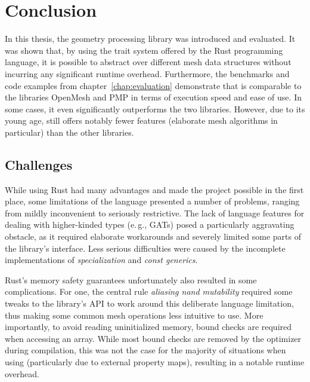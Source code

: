 \chapter{Conclusion}
\label{chap:conclusion}

In this thesis, the geometry processing library  was introduced and evaluated.
It was shown that, by using the trait system offered by the Rust programming language,  it is possible to abstract over different mesh data structures without incurring any significant runtime overhead.
Furthermore, the benchmarks and code examples from chapter~\ref{chap:evaluation} demonstrate that  is comparable to the \cpp libraries OpenMesh and PMP in terms of execution speed and ease of use.
In some cases, it even significantly outperforms the two \cpp libraries.
However, due to its young age,  still offers notably fewer features (elaborate mesh algorithms in particular) than the other libraries.



\vfill
\section{Challenges}

While using Rust had many advantages and made the project possible in the first place, some limitations of the language presented a number of problems, ranging from mildly inconvenient to seriously restrictive.
The lack of language features for dealing with higher-kinded types (e.\,g., GATs) posed a particularly aggravating obstacle, as it required elaborate workarounds and severely limited some parts of the library's interface.
Less serious difficulties were caused by the incomplete implementations of \emph{specialization} and \emph{const generics}.

Rust's memory safety guarantees unfortunately also resulted in some complications.
For one, the central rule \emph{aliasing nand mutability} required some tweaks to the library's API to work around this deliberate language limitation, thus making some common mesh operations less intuitive to use.
More importantly, to avoid reading uninitialized memory, bound checks are required when accessing an array.
While most bound checks are removed by the optimizer during compilation, this was not the case for the majority of situations when using  (particularly due to external property maps), resulting in a notable runtime overhead.


